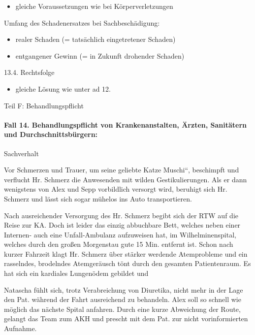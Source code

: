 \documentclass{article}
\begin{document}
\begin{itemize}
\item[] gleiche Voraussetzungen wie bei K\"orperverletzungen

\end{itemize}
Umfang des Schadenersatzes bei Sachbesch\"adigung:

\begin{itemize}
\item realer Schaden (= tats\"achlich eingetretener Schaden)

\item entgangener Gewinn (= in Zukunft drohender Schaden)

\end{itemize}
13.4. Rechtsfolge

\begin{itemize}
\item gleiche L\"osung wie unter ad 12.

\end{itemize}
Teil F: Behandlungspflicht

\paragraph{Fall 14. Behandlungspflicht von Krankenanstalten, \"Arzten,
Sanit\"atern und Durchschnittsb\"urgern:}
Sachverhalt

Vor Schmerzen und Trauer, um seine geliebte Katze
{\quotedblbase}Muschi{\textquotedblleft}, beschimpft und verflucht Hr.
Schmerz die Anwesenden mit wilden Gestikulierungen. Als er dann
wenigstens von Alex und Sepp vorbildlich versorgt wird, beruhigt sich
Hr. Schmerz und l\"asst sich sogar m\"uhelos ins Auto transportieren. 

Nach ausreichender Versorgung des Hr. Schmerz begibt sich der RTW auf
die Reise zur KA. Doch ist leider das einzig abbuchbare Bett, welches
neben einer Internen- auch eine Unfall-Ambulanz aufzuweisen hat, im
Wilhelminenspital, welches durch den gro{\ss}en Morgenstau gute 15 Min.
entfernt ist. Schon nach kurzer Fahrzeit klagt Hr. Schmerz \"uber
st\"arker werdende Atemprobleme und ein rasselndes, brodelndes
Atemger\"ausch t\"ont durch den gesamten Patientenraum. Es hat sich ein
kardiales Lungen\"odem gebildet und 

Natascha f\"uhlt sich, trotz Verabreichung von Diuretika, nicht mehr in
der Lage den Pat. w\"ahrend der Fahrt ausreichend zu behandeln. Alex
soll so schnell wie m\"oglich das n\"achste Spital anfahren. Durch eine
kurze Abweichung der Route, gelangt das Team zum AKH und prescht mit
dem Pat. zur nicht vorinformierten Aufnahme. 
\end{document}
